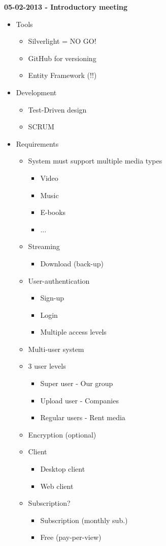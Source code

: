 \documentclass[11pt]{article}
\begin{document}
\begin{landscape}
\begin{multicols}{2}
\textbf{05-02-2013 - Introductory meeting}
\begin{itemize}
\item Tools
\begin{itemize}
\item Silverlight = NO GO!
\item GitHub for versioning
\item Entity Framework (!!)
\end{itemize}
\item Development
\begin{itemize}
\item Test-Driven design
\item SCRUM
\end{itemize}
\item Requirements
\begin{itemize}
\item System must support multiple media types
\begin{itemize}
\item Video
\item Music
\item E-books
\item ...
\end{itemize}
\item Streaming
\begin{itemize}
\item Download (back-up)
\end{itemize}
\item User-authentication
\begin{itemize}
\item Sign-up
\item Login
\item Multiple access levels
\end{itemize}
\item Multi-user system
\item 3 user levels
\begin{itemize}
\item Super user - Our group
\item Upload user - Companies
\item Regular users - Rent media
\end{itemize}
\item Encryption (optional)
\item Client
\begin{itemize}
\item Desktop client
\item Web client
\end{itemize}
\item Subscription?
\begin{itemize}
\item Subscription (monthly sub.)
\item Free (pay-per-view)
\end{itemize}
\end{itemize}
\end{itemize}
\end{multicols}

\end{landscape}
\end{document}
